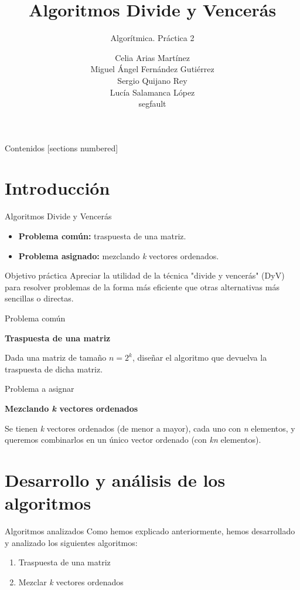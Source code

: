 \documentclass[10pt, xcolor=table]{beamer}
\title{Algoritmos Divide y Vencerás}
\subtitle{Algorítmica. \alert{Práctica 2}}
\date{}
\author{Celia Arias Martínez\\Miguel Ángel Fernández Gutiérrez\\Sergio Quijano Rey\\Lucía Salamanca López\\[4pt]\footnotesize{segfault}}
\begin{document}
\maketitle

\begin{frame}{Contenidos}
	[sections numbered]
	\tableofcontents[]
\end{frame}


\section{Introducción}
\begin{frame}{Algoritmos Divide y Vencerás}
\begin{itemize}
	\item \textbf{Problema común:} traspuesta de una matriz.
	\item \textbf{Problema asignado:} mezclando \textit{k} vectores ordenados.
\end{itemize}
\end{frame}

\begin{frame}{Objetivo práctica}
Apreciar la utilidad de la técnica "divide y vencerás" (DyV)  para resolver problemas de la forma más eficiente que otras alternativas más sencillas o directas. 
\end{frame}

\begin{frame}{Problema común}
\begin{center}
\textbf{\large{Traspuesta de una matriz}}
\end{center}
Dada una matriz de tamaño $n=2^k$, diseñar el algoritmo que devuelva la traspuesta de dicha matriz.
\end{frame}

\begin{frame}{Problema a asignar}
\begin{center}
\textbf{\large{Mezclando \textit{k} vectores ordenados}}
\end{center}
Se tienen \textit{k} vectores ordenados (de menor a mayor), cada uno con \textit{n} elementos, y queremos combinarlos en un único vector ordenado (con \textit{kn} elementos). 
\end{frame}

\section{Desarrollo y análisis de los algoritmos}
\begin{frame}{Algoritmos analizados}
Como hemos explicado anteriormente, hemos desarrollado y analizado los siguientes algoritmos:
\begin{enumerate}
	\item Traspuesta de una matriz
	\item Mezclar \textit{k} vectores ordenados	
\end{enumerate}
\end{frame}
\end{document}
